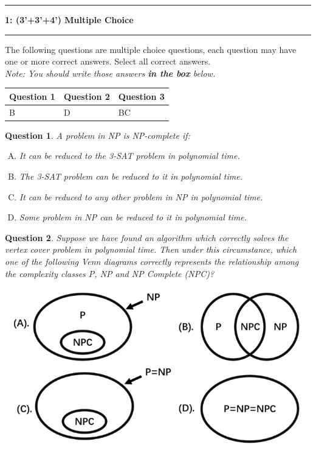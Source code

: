 \documentclass{article}
\newcommand\question[2]{\vspace{.25in}\hrule\textbf{#1: #2}\vspace{.5em}\hrule\vspace{.10in}}
\newtheorem{Q}{Question}
\begin{document}
\question{1}{(3'+3'+4') Multiple Choice}
The following \textit{} questions are multiple choice questions, each question may have one or more correct answers. Select all correct answers.\\
\textit{Note: You should write those answers \textbf{in the box} below.}

\begin{table}[htbp]
	\begin{tabular}{|p{2cm}|p{2cm}|p{2cm}|}
		\hline
		Question 1 & Question 2 & Question 3 \\
		\hline
		B          & D          & BC         \\
		\hline
	\end{tabular}
\end{table}



\begin{Q}
	A problem in NP is NP-complete if:
	\begin{enumerate}[(A)]
		\item It can be reduced to the 3-SAT problem in polynomial time.
		\item The 3-SAT problem can be reduced to it in polynomial time.
		\item It can be reduced to any other problem in NP in polynomial time.
		\item Some problem in NP can be reduced to it in polynomial time.
	\end{enumerate}
\end{Q}


\begin{Q}
	Suppose we have found an algorithm which correctly solves the vertex cover problem in polynomial time. Then under this circumstance, which one of the following Venn diagrams correctly represents the relationship among the complexity classes P, NP and NP Complete (NPC)?
	\begin{center}
		\includegraphics[scale=0.7]{HW12-Q2.png}
	\end{center}
\end{Q}
\end{document}
